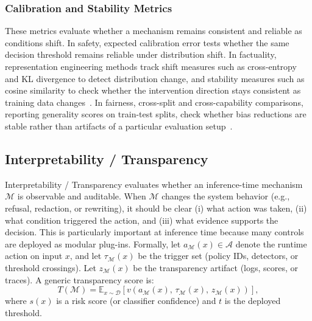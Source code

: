 \subsubsection{Calibration and Stability Metrics}
These metrics evaluate whether a mechanism remains consistent and reliable as conditions shift. In safety, expected calibration error tests whether the same decision threshold remains reliable under distribution shift. In factuality, representation engineering methods track shift measures such as cross-entropy and KL divergence to detect distribution change, and stability measures such as cosine similarity to check whether the intervention direction stays consistent as training data changes~\citep{li2023iti, zou2023representation, bayat2024enhanced}. In fairness, cross-split and cross-capability comparisons, reporting generality scores on train-test splits, check whether bias reductions are stable rather than artifacts of a particular evaluation setup~\citep{qin2024mitigating, cai2024locating}.


\subsection{Interpretability / Transparency}
Interpretability / Transparency evaluates whether an inference-time mechanism $\mathcal{M}$ is observable and auditable. When $\mathcal{M}$ changes the system behavior (e.g., refusal, redaction, or rewriting), it should be clear (i) what action was taken, (ii) what condition triggered the action, and (iii) what evidence supports the decision. This is particularly important at inference time because many controls are deployed as modular plug-ins. Formally, let $a_{\mathcal{M}}(x)\in\mathcal{A}$ denote the runtime action on input $x$, and let $\tau_{\mathcal{M}}(x)$ be the trigger set (policy IDs, detectors, or threshold crossings). Let $z_{\mathcal{M}}(x)$ be the transparency artifact (logs, scores, or traces). A generic transparency score is:
\[
T(\mathcal{M})
=
\mathbb{E}_{x\sim\mathcal{D}}
\left[
v\!\left(a_{\mathcal{M}}(x),\, \tau_{\mathcal{M}}(x),\, z_{\mathcal{M}}(x)\right)
\right],
\]
where $s(x)$ is a risk score (or classifier confidence) and $t$ is the deployed threshold.


